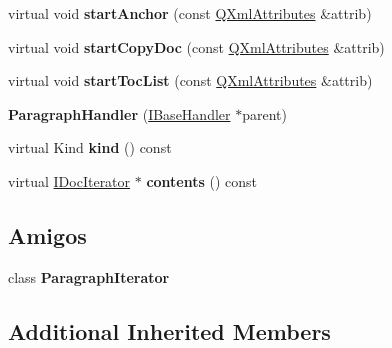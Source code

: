 \begin{DoxyCompactItemize}
\item 
\hypertarget{class_paragraph_handler_a13989618fc696558cb6fe547d7b58162}{virtual void {\bfseries start\-Anchor} (const \hyperlink{class_q_xml_attributes}{Q\-Xml\-Attributes} \&attrib)}\label{class_paragraph_handler_a13989618fc696558cb6fe547d7b58162}

\item 
\hypertarget{class_paragraph_handler_a3445d718c233b78b9887cd6af626a569}{virtual void {\bfseries start\-Copy\-Doc} (const \hyperlink{class_q_xml_attributes}{Q\-Xml\-Attributes} \&attrib)}\label{class_paragraph_handler_a3445d718c233b78b9887cd6af626a569}

\item 
\hypertarget{class_paragraph_handler_a39d504ade0f9685172c4bf0d102aafeb}{virtual void {\bfseries start\-Toc\-List} (const \hyperlink{class_q_xml_attributes}{Q\-Xml\-Attributes} \&attrib)}\label{class_paragraph_handler_a39d504ade0f9685172c4bf0d102aafeb}

\item 
\hypertarget{class_paragraph_handler_ab9dcdc8d4d66f95cdef59389917cfe07}{{\bfseries Paragraph\-Handler} (\hyperlink{class_i_base_handler}{I\-Base\-Handler} $\ast$parent)}\label{class_paragraph_handler_ab9dcdc8d4d66f95cdef59389917cfe07}

\item 
\hypertarget{class_paragraph_handler_af8e62c8a81ddf2283205cc8955de50eb}{virtual Kind {\bfseries kind} () const }\label{class_paragraph_handler_af8e62c8a81ddf2283205cc8955de50eb}

\item 
\hypertarget{class_paragraph_handler_a6f867db5d47aa2210c77df9bc5953008}{virtual \hyperlink{class_i_doc_iterator}{I\-Doc\-Iterator} $\ast$ {\bfseries contents} () const }\label{class_paragraph_handler_a6f867db5d47aa2210c77df9bc5953008}

\end{DoxyCompactItemize}
\subsection*{Amigos}
\begin{DoxyCompactItemize}
\item 
\hypertarget{class_paragraph_handler_a7fa8f6c15543966442bacc223e8c0721}{class {\bfseries Paragraph\-Iterator}}\label{class_paragraph_handler_a7fa8f6c15543966442bacc223e8c0721}

\end{DoxyCompactItemize}
\subsection*{Additional Inherited Members}


